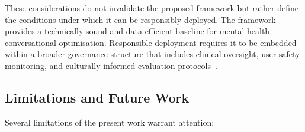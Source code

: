 \documentclass[mathematics,article,xetex,moreauthors]{Definitions/mdpi}
\begin{document}
These considerations do not invalidate the proposed framework but rather
define the conditions under which it can be responsibly deployed. The
framework provides a technically sound and data-efficient baseline for
mental-health conversational optimisation. Responsible deployment requires
it to be embedded within a broader governance structure that includes
clinical oversight, user safety monitoring, and culturally-informed
evaluation protocols~\cite{apa2024_advisory,harvard2024_safety}.

\subsection{Limitations and Future Work}
\label{sec:limitations}

Several limitations of the present work warrant attention:
\end{document}
